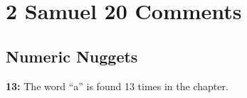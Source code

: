 \section{2 Samuel 20 Comments}

\subsection{Numeric Nuggets}
\textbf{13: } The word ``a'' is found 13 times in the chapter.